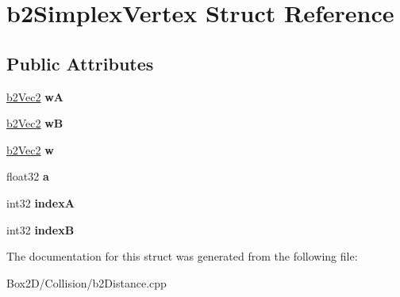 \hypertarget{structb2_simplex_vertex}{}\section{b2\+Simplex\+Vertex Struct Reference}
\label{structb2_simplex_vertex}
\subsection*{Public Attributes}
\begin{DoxyCompactItemize}
\item 
\mbox{\label{structb2_simplex_vertex_a35098ec42d2615c7dc6d645e4a7c0674}} 
\hyperlink{structb2_vec2}{b2\+Vec2} {\bfseries wA}
\item 
\mbox{\label{structb2_simplex_vertex_a73d6b5be3648a293b103d559e9d03534}} 
\hyperlink{structb2_vec2}{b2\+Vec2} {\bfseries wB}
\item 
\mbox{\label{structb2_simplex_vertex_a32e374d7bbb6d8a0589a91bd3de3029f}} 
\hyperlink{structb2_vec2}{b2\+Vec2} {\bfseries w}
\item 
\mbox{\label{structb2_simplex_vertex_ace99ab00d1d83a7290d283f73671e594}} 
float32 {\bfseries a}
\item 
\mbox{\label{structb2_simplex_vertex_ac53c648f53d28391aaff758d99a7868d}} 
int32 {\bfseries indexA}
\item 
\mbox{\label{structb2_simplex_vertex_a0c25e5f713707356122e91bd20e4f40c}} 
int32 {\bfseries indexB}
\end{DoxyCompactItemize}


The documentation for this struct was generated from the following file\+:\begin{DoxyCompactItemize}
\item 
Box2\+D/\+Collision/b2\+Distance.\+cpp\end{DoxyCompactItemize}
